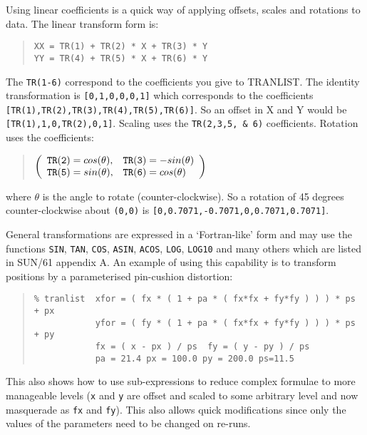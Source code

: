 \documentclass[twoside,11pt]{article}
\renewcommand{\_}{\texttt{\symbol{95}}}
\newenvironment{myquote}{\begin{quote}\begin{small}}{\end{small}\end{quote}}
\newcommand{\text}[1]{{\small \tt #1}}
\newcommand{\routine}[1]{{\sc #1}}
\begin{document}
Using linear coefficients is a quick way of applying offsets, scales and
rotations to data. The linear transform form is:
\begin{myquote}
\begin{verbatim}
XX = TR(1) + TR(2) * X + TR(3) * Y
YY = TR(4) + TR(5) * X + TR(6) * Y
\end{verbatim}
\end{myquote}
The \text{TR(1-6)} correspond to the coefficients you give to
\routine{TRANLIST}.
The identity transformation is \text{[0,1,0,0,0,1]} which corresponds
to the coefficients \text{[TR(1),TR(2),TR(3),TR(4),TR(5),TR(6)]}.
So an offset in X and Y would be \text{[TR(1),1,0,TR(2),0,1]}.
Scaling uses the \text{TR(2,3,5, \& 6)} coefficients.
Rotation uses the coefficients:
\begin{myquote}
\(
\left(
     \begin{array}{ll}
        \text{TR(2)} = cos(\theta), & \text{TR(3)} = -sin(\theta) \\
        \text{TR(5)} = sin(\theta), & \text{TR(6)} = cos(\theta) \\
     \end{array}
\right)
\)
\end{myquote}
where $\theta$ is the angle to rotate (counter-clockwise). So a rotation
of 45 degrees counter-clockwise about \text{(0,0)} is
\text{[0,0.7071,-0.7071,0,0.7071,0.7071]}.

General transformations are expressed in a `Fortran-like' form and may
use the functions \text{SIN}, \text{TAN}, \text{COS},
\text{ASIN},
\text{ACOS}, \text{LOG}, \text{LOG10} and many others  which are
listed in SUN/61 appendix A. An example of using this capability is to
transform positions by a parameterised pin-cushion distortion:
\begin{myquote}
\begin{verbatim}
% tranlist  xfor = ( fx * ( 1 + pa * ( fx*fx + fy*fy ) ) ) * ps + px
            yfor = ( fy * ( 1 + pa * ( fx*fx + fy*fy ) ) ) * ps + py
            fx = ( x - px ) / ps  fy = ( y - py ) / ps
            pa = 21.4 px = 100.0 py = 200.0 ps=11.5
\end{verbatim}
\end{myquote}
This also shows how to use sub-expressions to reduce complex formulae to
more manageable levels (\text{x} and \text{y} are offset and scaled
to some arbitrary level and now masquerade as \text{fx} and
\text{fy}). This also allows quick modifications since only the values
of the parameters need to be changed on re-runs.
\end{document}
